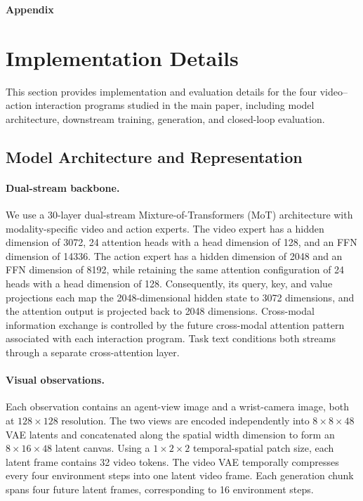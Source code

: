 \clearpage
\setcounter{page}{1}

\clearpage

\appendix


\begin{center}
    \Large\bfseries Appendix
\end{center}
\vspace{1em}


\section{Implementation Details}
\label{sec:supp-impl}

This section provides implementation and evaluation details for the four video--action interaction programs studied in the main paper, including model architecture, downstream training, generation, and closed-loop evaluation.

\subsection{Model Architecture and Representation}
\label{sec:supp-architecture}

\paragraph{Dual-stream backbone.}
We use a 30-layer dual-stream Mixture-of-Transformers (MoT) architecture with modality-specific video and action experts.
The video expert has a hidden dimension of 3072, 24 attention heads with a head dimension of 128, and an FFN dimension of 14336. The action expert has a hidden dimension of 2048 and an FFN dimension of 8192, while retaining the same attention configuration of 24 heads with a head dimension of 128. Consequently, its query, key, and value projections each map the 2048-dimensional hidden state to 3072 dimensions, and the attention output is projected back to 2048 dimensions. 
Cross-modal information exchange is controlled by the future cross-modal attention pattern associated with each interaction program.
Task text conditions both streams through a separate cross-attention layer.

\paragraph{Visual observations.}
Each observation contains an agent-view image and a wrist-camera
image, both at $128\times128$ resolution. 
The two views are encoded independently into \(8\times8\times48\) VAE latents and concatenated along the spatial width dimension to form an \(8\times16\times48\) latent canvas.
Using a \(1\times2\times2\) temporal-spatial patch size, each latent frame contains 32 video tokens.
The video VAE temporally compresses every four environment steps into one latent video frame. Each generation chunk spans four future latent frames, corresponding to 16 environment steps.

